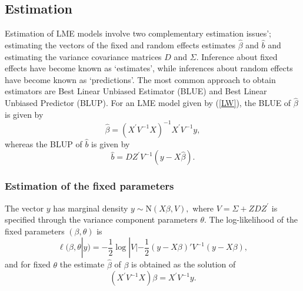 \documentclass[12pt, a4paper]{report}
\theoremstyle{plain}
\theoremstyle{definition}
\theoremstyle{remark}
\begin{document}
	
	
	
	\subsection{Estimation}
	Estimation of LME models involve two complementary estimation issues'; estimating the vectors of the fixed and random effects estimates $\hat{\beta}$ and $\hat{b}$ and estimating the variance covariance matrices $D$ and $\Sigma$.
	Inference about fixed effects have become known as `estimates', while inferences about random effects have become known as `predictions'. The most common approach to obtain estimators are Best Linear Unbiased Estimator (BLUE) and Best Linear Unbiased Predictor (BLUP). For an LME model given by (\ref{LW}), the BLUE of $\hat{\beta}$ is given by
	\[\hat{\beta} = (X^\prime V^{-1}X)^{-1}X^\prime V^{-1}y,\]whereas the BLUP of $\hat{b}$ is given by
	\[\hat{b} = DZ^{\prime} V^{-1} (y-X\hat{\beta}).\]
	
	
	
	\subsubsection{Estimation of the fixed parameters}
	
	The vector $y$ has marginal density $y \sim \mathrm{N}(X \beta,V),$ where $V = \Sigma + ZDZ^\prime$ is specified through the variance component parameters $\theta.$ The log-likelihood of the fixed parameters $(\beta, \theta)$ is
	\begin{equation}
	\ell (\beta, \theta|y) =
	-\frac{1}{2} \log |V| -\frac{1}{2}(y -
	X \beta)'V^{-1}(y -
	X \beta), \label{Likelihood:MarginalModel}
	\end{equation}
	and for fixed $\theta$ the estimate $\hat{\beta}$ of $\beta$ is obtained as the solution of
	\begin{equation}
	(X^\prime V^{-1}X) {\beta} = X^\prime V^{-1}y.
	\label{mle:beta:hat}
	\end{equation}
	
\end{document}

